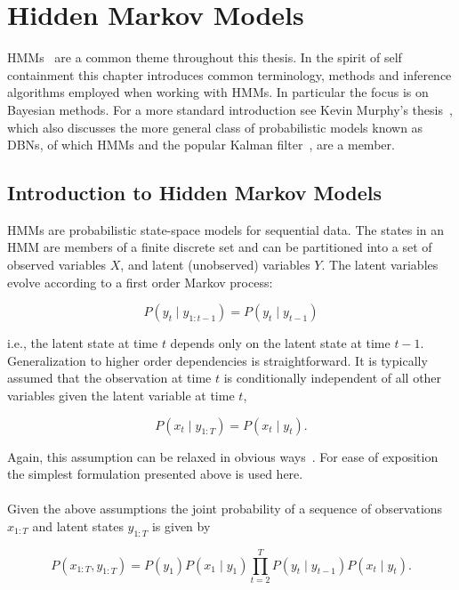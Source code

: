 \documentclass[12pt]{report}
\newcommand{\1}[0]{\mathbbm{1}}
\newcommand{\seq}[3]{\ensuremath{#1_{{#2}:{#3}}}}
\begin{document}
\chapter{Hidden Markov Models}
\label{chap: Hidden Markov Models}
\acp{HMM}~\cite{rabiner-hmms} are a common theme throughout this thesis.
In the spirit of self containment this chapter introduces common terminology,
methods and inference algorithms employed when working with \acp{HMM}. In particular
the focus is on Bayesian methods. For a more standard introduction see Kevin Murphy's
thesis~\cite{murphy-thesis}, which also discusses the more general class of probabilistic models
known as \acp{DBN}, of which \acp{HMM} and the popular Kalman filter~\cite{kalman-filter}, are a member.

\section{Introduction to Hidden Markov Models}
\label{sec:Introduction to Hidden Markov Models}
\acp{HMM} are probabilistic state-space models for sequential data.
The states in an \ac{HMM} are members of a finite discrete set and
can be partitioned into a set of observed variables $X$, and latent
(unobserved) variables $Y$. The latent variables evolve according to
a first order Markov process:

\[
    P(y_t \mid \seq{y}{1}{t-1}) = P(y_t \mid y_{t-1})
\]

i.e., the latent state at time $t$ depends only on the latent state
at time $t-1$. Generalization to higher order dependencies is straightforward.
It is typically assumed that the observation at time $t$ is conditionally
independent of all other variables given the latent variable at time $t$,

\[
    P(x_t \mid \seq{y}{1}{T}) = P(x_t \mid y_t).
\]

Again, this assumption can be relaxed in obvious ways~\cite{autoregressive-shannon}.
For ease of exposition the simplest formulation presented above is used here.
\\\\
Given the above assumptions the joint probability of a sequence of observations
$\seq{x}{1}{T}$ and latent states $\seq{y}{1}{T}$ is given by

\begin{equation}\label{eq:hmm-joint}
    P(\seq{x}{1}{T}, \seq{y}{1}{T}) =
    P(y_1)P(x_1 \mid y_1) \prod_{t=2}^T P(y_t \mid y_{t-1}) P(x_t \mid y_t).
\end{equation}
\end{document}
